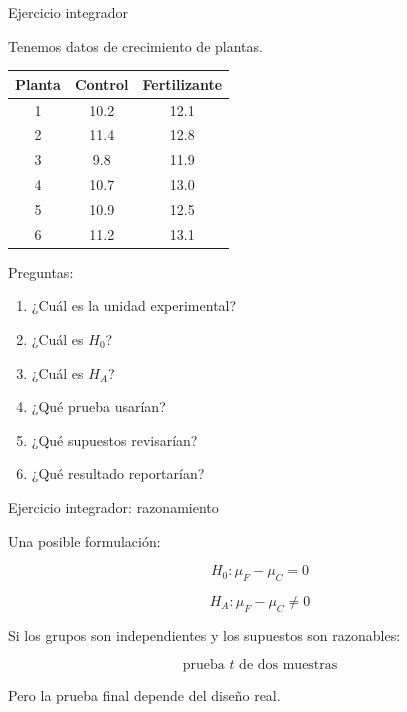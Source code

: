 \begin{frame}{Ejercicio integrador}

Tenemos datos de crecimiento de plantas.

\begin{center}
\begin{tabular}{ccc}
\toprule
Planta & Control & Fertilizante\\
\midrule
1 & 10.2 & 12.1\\
2 & 11.4 & 12.8\\
3 & 9.8 & 11.9\\
4 & 10.7 & 13.0\\
5 & 10.9 & 12.5\\
6 & 11.2 & 13.1\\
\bottomrule
\end{tabular}
\end{center}

Preguntas:

\begin{enumerate}
    \item ¿Cuál es la unidad experimental?
    \item ¿Cuál es $H_0$?
    \item ¿Cuál es $H_A$?
    \item ¿Qué prueba usarían?
    \item ¿Qué supuestos revisarían?
    \item ¿Qué resultado reportarían?
\end{enumerate}

\end{frame}

\begin{frame}{Ejercicio integrador: razonamiento}

Una posible formulación:

\[
H_0:\mu_F-\mu_C=0
\]

\[
H_A:\mu_F-\mu_C\neq0
\]

Si los grupos son independientes y los supuestos son razonables:

\[
\boxed{\text{prueba }t\text{ de dos muestras}}
\]

Pero la prueba final depende del diseño real.

\end{frame}

